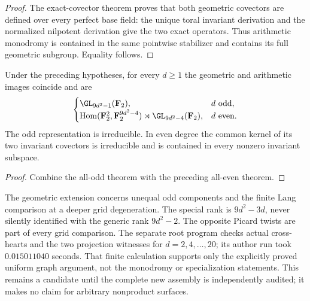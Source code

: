 \begin{proof}
The exact-covector theorem proves that both geometric
covectors are defined over every perfect base field:
the unique toral invariant derivation and the normalized
nilpotent derivation give the two exact operators.
Thus arithmetic monodromy is contained in the same
pointwise stabilizer and contains its full geometric
subgroup. Equality follows.
\end{proof}

\begin{corollary}
\label{cor:mixed-every-fixed-modulus-all-degrees-candidate}
Under the preceding hypotheses, for every $d\geq1$ the
geometric and arithmetic images coincide and are
\[
 \begin{cases}
 \GL_{9d^2-1}(\mathbf F_2),&d\text{ odd},\\
 \operatorname{Hom}(\mathbf F_2^2,\mathbf F_2^{9d^2-4})
       \rtimes\GL_{9d^2-4}(\mathbf F_2),&d\text{ even}.
 \end{cases}
\]
The odd representation is irreducible. In even degree the
common kernel of its two invariant covectors is irreducible
and is contained in every nonzero invariant subspace.
\end{corollary}
\begin{proof}
Combine the all-odd theorem with the preceding all-even theorem.
\end{proof}

\begin{remark}
\label{rem:mixed-all-even-wreath-scope-candidate}
The geometric extension concerns unequal odd components and
the finite Lang comparison at a deeper grid degeneration.
The special rank is $9d^2-3d$, never silently identified
with the generic rank $9d^2-2$. The opposite Picard twists
are part of every grid comparison. The separate root
program 
checks actual cross-hearts and the two projection witnesses
for $d=2,4,\ldots,20$; its author run took
$0.015011040$ seconds. That finite calculation supports
only the explicitly proved uniform graph argument, not
the monodromy or specialization statements. This remains
a candidate until the complete new assembly is independently
audited; it makes no claim for arbitrary nonproduct surfaces.
\end{remark}
